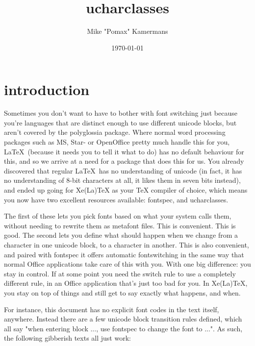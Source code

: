 \documentclass{article}
\begin{document}
	\title{ucharclasses}
	\author{Mike "Pomax" Kamermans}
	\date{\today}
	\maketitle

	\tableofcontents

	\pagebreak

	\section{introduction}
	
		Sometimes you don't want to have to bother with font switching just because you're languages that are distinct enough to use different unicode blocks, but aren't covered by the polyglossia package. Where normal word processing packages such as MS, Star- or OpenOffice pretty much handle this for you, \LaTeX\ (because it needs you to tell it what to do) has no default behaviour for this, and so we arrive at a need for a package that does this for us. You already discovered that regular \LaTeX\ has no understanding of unicode (in fact, it has no understanding of 8-bit characters at all, it likes them in seven bits instead), and ended up going for Xe(La)TeX as your TeX compiler of choice, which means you now have two excellent resources available: fontspec, and ucharclasses.
		
		The first of these lets you pick fonts based on what your system calls them, without needing to rewrite them as metafont files. This is convenient. This is good. The second lets you define what should happen when we change from a character in one unicode block, to a character in another. This is also convenient, and paired with fontspec it offers automatic fontswitching in the same way that normal Office applications take care of this with you. With one big difference: you stay in control. If at some point you need the switch rule to use a completely different rule, in an Office application that's just too bad for you. In Xe(La)TeX, you stay on top of things and still get to say exactly what happens, and when.
		
		For instance, this document has no explicit font codes in the text itself, anywhere. Instead there are a few unicode block transition rules defined, which all say "when entering block ..., use fontspec to change the font to ...". As such, the following gibberish texts all just work:
		
\end{document}
